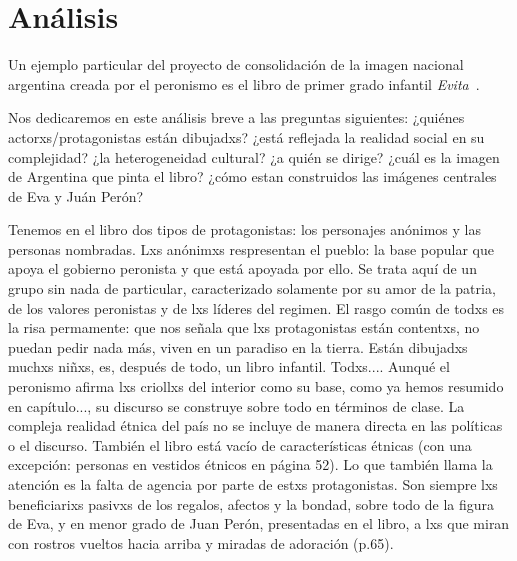 \section{Análisis}

Un ejemplo particular del proyecto de consolidación de la imagen nacional argentina creada por el peronismo es el libro de primer grado infantil \textit{Evita}~\autocite{Albornoz1952}.

Nos dedicaremos en este análisis breve a las preguntas siguientes:
¿quiénes actorxs/protagonistas están dibujadxs?
¿está reflejada la realidad social en su complejidad?
¿la heterogeneidad cultural?
¿a quién se dirige?
¿cuál es la imagen de Argentina que pinta el libro?
¿cómo estan construidos las imágenes centrales de Eva y Juán Perón?

Tenemos en el libro dos tipos de protagonistas: los personajes anónimos y las personas nombradas.
Lxs anónimxs respresentan el pueblo: la base popular que apoya el gobierno peronista y que está apoyada por ello.
Se trata aquí de un grupo sin nada de particular, caracterizado solamente por su amor de la patria, de los valores peronistas y de lxs líderes del regimen.
El rasgo común de todxs es la risa permamente: que nos señala que lxs protagonistas están contentxs, no puedan pedir nada más, viven en un paradiso en la tierra.
Están dibujadxs muchxs niñxs, es, después de todo, un libro infantil.
Todxs....
Aunqué el peronismo afirma lxs criollxs del interior como su base, como ya hemos resumido en capítulo..., su discurso se construye sobre todo en términos de clase.
La compleja realidad étnica del país no se incluye de manera directa en las políticas o el discurso.
También el libro está vacío de características étnicas (con una excepción: personas en vestidos étnicos en página 52).
Lo que también llama la atención es la falta de agencia por parte de estxs protagonistas.
Son siempre lxs beneficiarixs pasivxs de los regalos, afectos y la bondad, sobre todo de la figura de Eva, y en menor grado de Juan Perón, presentadas en el libro, a lxs que miran con rostros vueltos hacia arriba y miradas de adoración (p.65).

